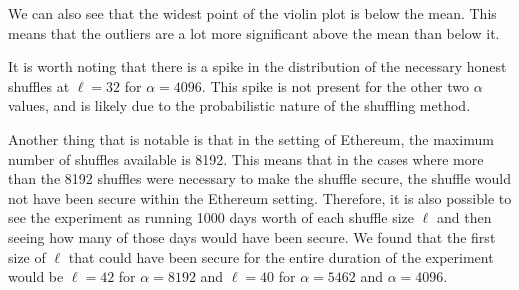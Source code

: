 We can also see that the widest point of the violin plot is below the mean.
This means that the outliers are a lot more significant above the mean than below it.

It is worth noting that there is a spike in the distribution of the necessary honest shuffles at $\ell=32$ for $\alpha=4096$.
This spike is not present for the other two $\alpha$ values, and is likely due to the probabilistic nature of the shuffling method.

Another thing that is notable is that in the setting of Ethereum, the maximum number of shuffles available is 8192.
This means that in the cases where more than the 8192 shuffles were necessary to make the shuffle secure, the shuffle would not have been secure within the Ethereum setting.
Therefore, it is also possible to see the experiment as running 1000 days worth of each shuffle size $\ell$ and then seeing how many of those days would have been secure.
We found that the first size of $\ell$ that could have been secure for the entire duration of the experiment would be $\ell=42$ for $\alpha=8192$ and $\ell=40$ for $\alpha=5462$ and $\alpha=4096$.


